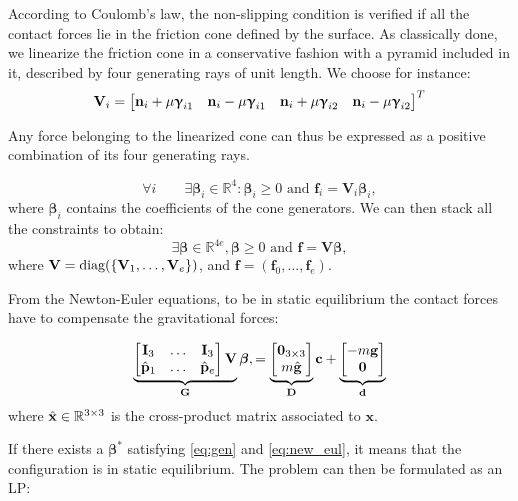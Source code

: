 According to Coulomb's law, the non-slipping condition is verified if all the contact forces lie in the friction cone defined by the surface.
As classically done, we linearize the friction cone in a conservative fashion with a pyramid included in it, described by four generating rays of unit length. We choose for instance:
\begin{equation*}
\mathbf{V}_{i} = \begin{bmatrix}\mathbf{n}_{i} + \mu \mathbf{\boldsymbol\upgamma}_{i1} & \mathbf{n}_{i} -\mu \mathbf{\boldsymbol\upgamma}_{i1} & \mathbf{n}_{i} + \mu \mathbf{\boldsymbol\upgamma}_{i2} & \mathbf{n}_{i} - \mu \mathbf{\boldsymbol\upgamma}_{i2}\end{bmatrix}^T
\end{equation*}

Any force belonging to the linearized cone
can thus be expressed as a positive combination of its four generating rays.

\begin{equation*}
\forall i  \qquad  \exists \bm{\beta}_i \in \mathbb{R}^{4} : \bm{\beta}_i \ge 0 \text{ and } \mathbf{f}_{i} = \mathbf{V}_{i} \bm{\beta}_i,
\end{equation*}
where $\bm{\beta}_i$ contains the coefficients of the cone generators.
We can then stack all the constraints to obtain:
\begin{equation}\label{eq:gen}
\exists \bm{\beta} \in \mathbb{R}^{4e} ,  \bm{\beta} \ge 0 \text{ and } \mathbf{f} = \mathbf{V} \bm{\beta},
\end{equation}
where $\mathbf{V} = \text{diag}( \{\mathbf{V}_1, \dots, \mathbf{V}_e\} )$, and $\mathbf{f} = (\mathbf{f}_0,...,\mathbf{f}_e)$.

From the Newton-Euler equations, to be in static equilibrium the contact forces have to compensate the gravitational forces:


\begin{align} \label{eq:new_eul}
\underbrace{
\mat{\mathbf{I}_3 & \dots & \mathbf{I}_3 \\
\hat{\mathbf{p}}_1 & \dots & \hat{\mathbf{p}}_e} \mathbf{V}
}_\mathbf{G} \bm{\beta}, = 
\underbrace{\mat{\mathbf{0}_{3\times 3} \\ m \hat{\mathbf{g}}}}_{\mathbf{D}} \mathbf{c} + 
\underbrace{\mat{-m\mathbf{g} \\ \mathbf{0}}}_{\mathbf{d}}
\end{align}
where $\hat{\mathbf{x}} \in \mathbb{R}^{3\times 3}$ is the cross-product matrix associated to $\mathbf{x}$.


If there exists a $\bm{\beta}^*$ satisfying \eqref{eq:gen} and \eqref{eq:new_eul}, it means that the configuration is in static equilibrium.
The problem can then be formulated as an LP:

